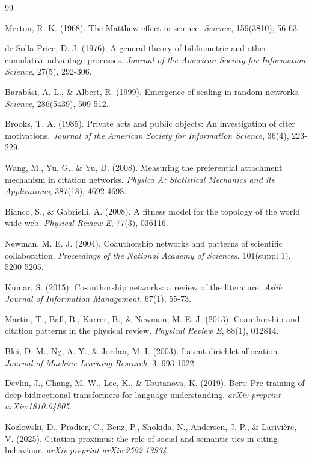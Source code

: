 \documentclass[11pt,a4paper]{article}
\begin{document}
\begin{thebibliography}{99}

Merton, R. K. (1968). The Matthew effect in science. \textit{Science}, 159(3810), 56-63.

de Solla Price, D. J. (1976). A general theory of bibliometric and other cumulative advantage processes. \textit{Journal of the American Society for Information Science}, 27(5), 292-306.

Barab\'{a}si, A.-L., \& Albert, R. (1999). Emergence of scaling in random networks. \textit{Science}, 286(5439), 509-512.

Brooks, T. A. (1985). Private acts and public objects: An investigation of citer motivations. \textit{Journal of the American Society for Information Science}, 36(4), 223-229.

Wang, M., Yu, G., \& Yu, D. (2008). Measuring the preferential attachment mechanism in citation networks. \textit{Physica A: Statistical Mechanics and its Applications}, 387(18), 4692-4698.

Bianco, S., \& Gabrielli, A. (2008). A fitness model for the topology of the world wide web. \textit{Physical Review E}, 77(3), 036116.

Newman, M. E. J. (2004). Coauthorship networks and patterns of scientific collaboration. \textit{Proceedings of the National Academy of Sciences}, 101(suppl 1), 5200-5205.

Kumar, S. (2015). Co-authorship networks: a review of the literature. \textit{Aslib Journal of Information Management}, 67(1), 55-73.

Martin, T., Ball, B., Karrer, B., \& Newman, M. E. J. (2013). Coauthorship and citation patterns in the physical review. \textit{Physical Review E}, 88(1), 012814.

Blei, D. M., Ng, A. Y., \& Jordan, M. I. (2003). Latent dirichlet allocation. \textit{Journal of Machine Learning Research}, 3, 993-1022.

Devlin, J., Chang, M.-W., Lee, K., \& Toutanova, K. (2019). Bert: Pre-training of deep bidirectional transformers for language understanding. \textit{arXiv preprint arXiv:1810.04805}.

Kozlowski, D., Pradier, C., Benz, P., Shokida, N., Andersen, J. P., \& Larivi\`{e}re, V. (2025). Citation proximus: the role of social and semantic ties in citing behaviour. \textit{arXiv preprint arXiv:2502.13934}.


\end{thebibliography}
\end{document}
